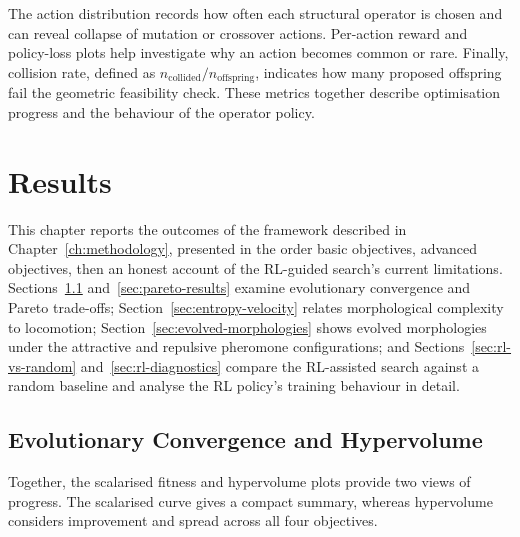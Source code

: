 \documentclass[12pt,a4paper]{report}
\begin{document}
The action distribution records how often each structural operator is chosen and can reveal collapse of mutation or crossover actions. Per-action reward and policy-loss plots help investigate why an action becomes common or rare. Finally, collision rate, defined as $n_{\mathrm{collided}}/n_{\mathrm{offspring}}$, indicates how many proposed offspring fail the geometric feasibility check. These metrics together describe optimisation progress and the behaviour of the operator policy.


\chapter{Results}
\label{ch:results}
This chapter reports the outcomes of the framework described in Chapter~\ref{ch:methodology}, presented in the order basic objectives, advanced objectives, then an honest account of the RL-guided search's current limitations. Sections~\ref{sec:convergence-hv} and~\ref{sec:pareto-results} examine evolutionary convergence and Pareto trade-offs; Section~\ref{sec:entropy-velocity} relates morphological complexity to locomotion; Section~\ref{sec:evolved-morphologies} shows evolved morphologies under the attractive and repulsive pheromone configurations; and Sections~\ref{sec:rl-vs-random} and~\ref{sec:rl-diagnostics} compare the RL-assisted search against a random baseline and analyse the RL policy's training behaviour in detail.

\section{Evolutionary Convergence and Hypervolume}
\label{sec:convergence-hv}
Together, the scalarised fitness and hypervolume plots provide two views of progress. The scalarised curve gives a compact summary, whereas hypervolume considers improvement and spread across all four objectives.
\end{document}
